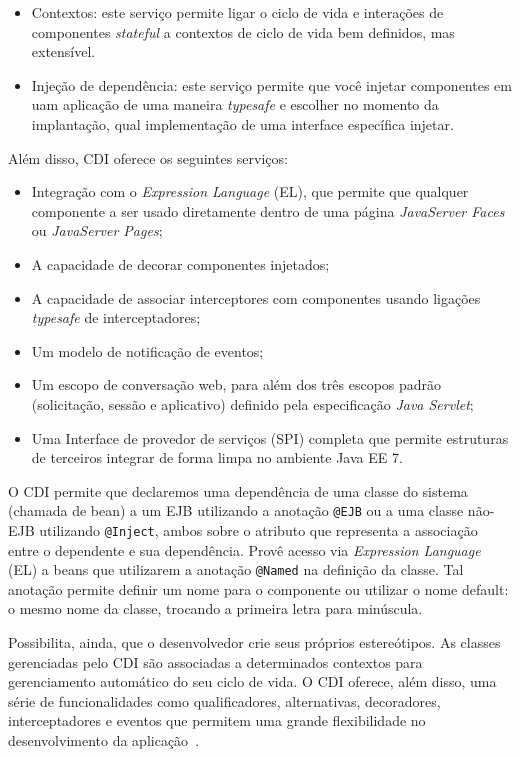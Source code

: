 \begin{itemize}
	\item Contextos: este serviço permite ligar o ciclo de vida e interações de componentes \textit{stateful} a contextos de ciclo de vida bem definidos, mas extensível.

	\item Injeção de dependência: este serviço permite que você injetar componentes em uam aplicação de uma maneira \textit{typesafe} e escolher no momento da implantação, qual implementação de uma interface específica injetar.
\end{itemize}

Além disso, CDI oferece os seguintes serviços:

\begin{itemize}
	\item Integração com o \textit{Expression Language} (EL), que permite que qualquer componente a ser usado diretamente dentro de uma página \textit{JavaServer Faces} ou \textit{JavaServer Pages};
	\item A capacidade de decorar componentes injetados;
	\item A capacidade de associar interceptores com componentes usando ligações \textit{typesafe} de interceptadores;
	\item Um modelo de notificação de eventos;
	\item Um escopo de conversação web, para além dos três escopos padrão (solicitação, sessão e aplicativo) definido pela especificação \textit{Java Servlet};
	\item Uma Interface de provedor de serviços (SPI) completa que permite estruturas de terceiros integrar de forma limpa no ambiente Java EE 7.
\end{itemize}

O CDI permite que declaremos uma dependência de uma classe do sistema (chamada de bean) a um EJB utilizando a anotação \texttt{@EJB} ou a uma classe não-EJB utilizando \texttt{@Inject}, ambos sobre o atributo que representa a associação entre o dependente e sua dependência. Provê acesso via \textit{Expression Language} (EL) a beans que utilizarem a anotação \texttt{@Named} na definição da classe. Tal anotação permite definir um nome para o componente ou utilizar o nome default: o mesmo nome da classe, trocando a primeira letra para minúscula. 

Possibilita, ainda, que o desenvolvedor crie seus próprios estereótipos. As classes gerenciadas pelo CDI são associadas a determinados contextos para gerenciamento automático do seu ciclo de vida. O CDI oferece, além disso, uma série de funcionalidades como qualificadores, alternativas, decoradores, interceptadores e eventos que permitem uma grande flexibilidade no desenvolvimento da aplicação~\cite{devmediacdi}.
